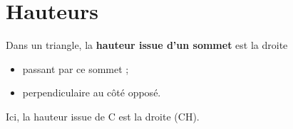 \documentclass[a4paper,11pt]{article}
\begin{document}
\section{Hauteurs}

\begin{cours}
	Dans un triangle, la \textbf{hauteur issue d'un sommet} est la droite
	\begin{itemize}
		\item passant par ce sommet ;
		\item perpendiculaire au côté opposé.
	\end{itemize}
\end{cours}

\begin{exemple}
	\begin{minipage}{0.58\linewidth}
	\end{minipage}
	\hspace{1em}
	\begin{minipage}{0.35\linewidth}
		Ici, la hauteur issue de C est la droite (CH).
	\end{minipage}
\end{exemple}
\end{document}
